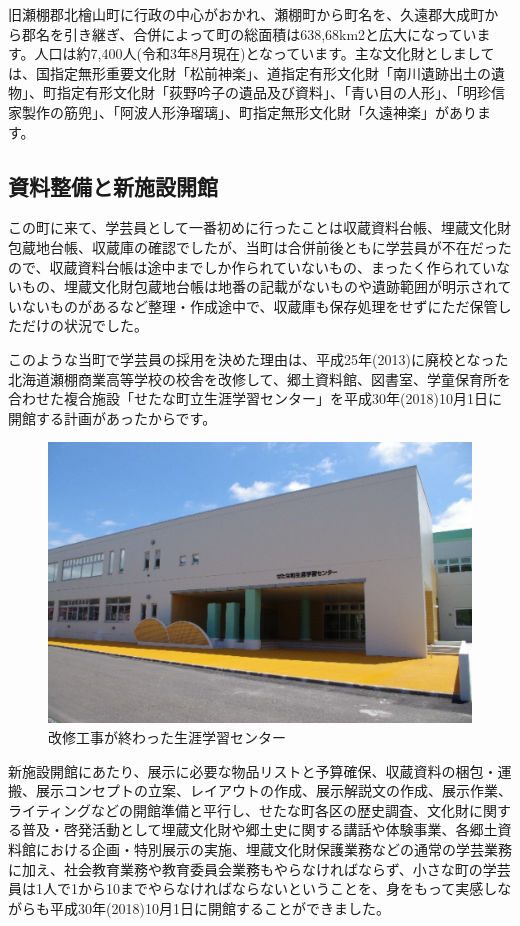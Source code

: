 \documentclass[a4j,11pt,twocolumn,openany]{jsbook}
\begin{document}
旧瀬棚郡北檜山町に行政の中心がおかれ、瀬棚町から町名を、久遠郡大成町から郡名を引き継ぎ、合併によって町の総面積は638,68km2と広大になっています。人口は約7,400人(令和3年8月現在)となっています。主な文化財としましては、国指定無形重要文化財「松前神楽」、道指定有形文化財「南川遺跡出土の遺物」、町指定有形文化財「荻野吟子の遺品及び資料」、「青い目の人形」、「明珍信家製作の筋兜」、「阿波人形浄瑠璃」、町指定無形文化財「久遠神楽」があります。

\newpage
\subsection{資料整備と新施設開館}
この町に来て、学芸員として一番初めに行ったことは収蔵資料台帳、埋蔵文化財包蔵地台帳、収蔵庫の確認でしたが、当町は合併前後ともに学芸員が不在だったので、収蔵資料台帳は途中までしか作られていないもの、まったく作られていないもの、埋蔵文化財包蔵地台帳は地番の記載がないものや遺跡範囲が明示されていないものがあるなど整理・作成途中で、収蔵庫も保存処理をせずにただ保管しただけの状況でした。

このような当町で学芸員の採用を決めた理由は、平成25年(2013)に廃校となった北海道瀬棚商業高等学校の校舎を改修して、郷土資料館、図書室、学童保育所を合わせた複合施設「せたな町立生涯学習センター」を平成30年(2018)10月1日に開館する計画があったからです。

\begin{figure}[H]
	\centering
	\includegraphics[width=\linewidth]{fig/04_Kudo/fig02.png}
	\caption{改修工事が終わった生涯学習センター}
	\label{}
\end{figure}

新施設開館にあたり、展示に必要な物品リストと予算確保、収蔵資料の梱包・運搬、展示コンセプトの立案、レイアウトの作成、展示解説文の作成、展示作業、ライティングなどの開館準備と平行し、せたな町各区の歴史調査、文化財に関する普及・啓発活動として埋蔵文化財や郷土史に関する講話や体験事業、各郷土資料館における企画・特別展示の実施、埋蔵文化財保護業務などの通常の学芸業務に加え、社会教育業務や教育委員会業務もやらなければならず、小さな町の学芸員は1人で1から10までやらなければならないということを、身をもって実感しながらも平成30年(2018)10月1日に開館することができました。
\end{document}
